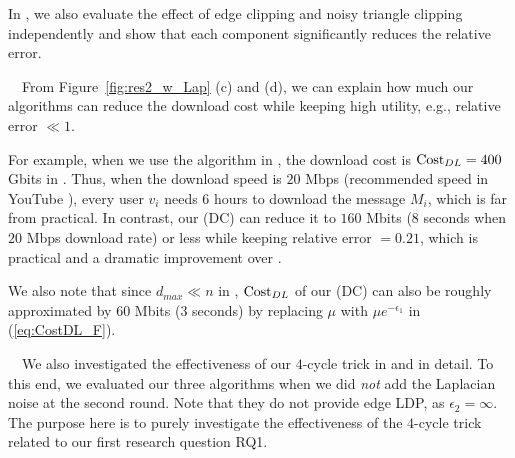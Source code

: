 In , we also evaluate the effect of edge clipping and noisy triangle clipping independently and show that each component significantly reduces the relative error. 

\smallskip
{}~~From Figure~\ref{fig:res2_w_Lap} (c) and (d), we can explain how much our algorithms can reduce the download cost while keeping high utility, e.g., relative error $\ll 1$. 

For example, when we use the algorithm in \cite{Imola_USENIX21}, the download cost is 
$\mathrm{Cost}_{DL} = 400$ Gbits in \IMDB{}. 
Thus, when the download speed is $20$ Mbps 
(recommended speed in YouTube \cite{YouTube_speed}), every user $v_i$ needs 6 hours to download the message $M_i$, which is far from practical. 
In contrast, our \AlgTwo{} (DC) can reduce it to 
$160$ 
Mbits (8 seconds when $20$ Mbps download rate) or less 
while keeping relative error $= 0.21$, 
which is practical and a dramatic improvement over \cite{Imola_USENIX21}. 

We also note that since $d_{max} \ll n$ in \IMDB{}, 
$\mathrm{Cost}_{DL}$ of our \AlgTwo{} (DC) 
can also be roughly approximated by $60$ Mbits (3 seconds) by replacing $\mu$ with $\mu e^{-\epsilon_1}$ in 
(\ref{eq:CostDL_F}). 


\smallskip
~~We 
also investigated 
the effectiveness of our $4$-cycle trick in \AlgTwo{} and \AlgThree{} 
in detail. 
To this end, we evaluated our three algorithms when we did \textit{not} add the Laplacian noise at the second round. 
Note that they do not provide edge LDP, as $\epsilon_2 = \infty$. 
The purpose here is to purely investigate the effectiveness of the $4$-cycle trick 
related to our first research question RQ1. 

